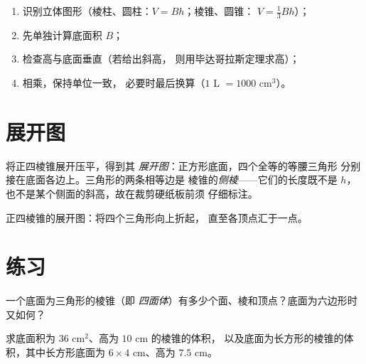\begin{method}[体积问题]\label{met:g8:solids:method}
\begin{enumerate}
  \item 识别立体图形（棱柱、圆柱：$V = Bh$；棱锥、圆锥：
        $V = \frac13 Bh$）；
  \item 先单独计算底面积 $B$；
  \item 检查高与底面垂直（若给出斜高，
        则用毕达哥拉斯定理求高）；
  \item 相乘，保持单位一致，
        必要时最后换算（$1$ L $= 1000$ cm$^3$）。
\end{enumerate}
\end{method}

\section{展开图}

\begin{example}[棱锥的展开图]\label{ex:g8:solids:net}
将正四棱锥展开压平，得到其
\emph{展开图}：正方形底面，四个全等的等腰三角形
分别接在底面各边上。三角形的两条相等边是
棱锥的\emph{侧棱}——它们的长度既不是 $h$，
也不是某个侧面的斜高，故在裁剪硬纸板前须
仔细标注。
\end{example}

\begin{omfigure}

{\small 正四棱锥的展开图：将四个三角形向上折起，
直至各顶点汇于一点。}
\end{omfigure}

\section{练习}

\begin{exercise}[$\star$]\label{exo:g8:solids:1}
一个底面为三角形的棱锥（即
\emph{四面体}）有多少个面、棱和顶点？底面为六边形时又如何？
\end{exercise}

\begin{exercise}[$\star$]\label{exo:g8:solids:2}
求底面积为 $36$ cm$^2$、高为 $10$ cm 的棱锥的体积，
以及底面为长方形的棱锥的体积，其中长方形底面为
$6 \times 4$ cm、高为 $7.5$ cm。
\end{exercise}


